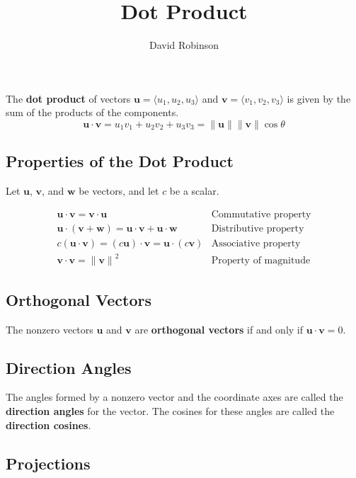 \documentclass{article}
\title{Dot Product}
\author{David Robinson}
\date{}
\begin{document}
\maketitle

The \textbf{dot product} of vectors $\mathbf{u}=\langle u_1, u_2, u_3 \rangle$ and $\mathbf{v}=\langle v_1, v_2, v_3 \rangle$ is given by the sum of the products of the components.
\[\mathbf{u}\cdot \mathbf{v}=u_1 v_1 + u_2 v_2 + u_3 v_3 = \|\mathbf{u}\| \|\mathbf{v}\| \cos\theta\]

\subsection*{Properties of the Dot Product}
Let $\mathbf{u}$, $\mathbf{v}$, and $\mathbf{w}$ be vectors, and let $c$ be a scalar.

\[
\begin{array}{ll}
    \mathbf{u}\cdot\mathbf{v} = \mathbf{v}\cdot\mathbf{u} & \text{Commutative property} \\[5pt]
    \mathbf{u}\cdot (\mathbf{v}+\mathbf{w}) = \mathbf{u}\cdot\mathbf{v} + \mathbf{u}\cdot\mathbf{w} & \text{Distributive property} \\[5pt]
    c (\mathbf{u}\cdot\mathbf{v}) = (c\mathbf{u})\cdot\mathbf{v} = \mathbf{u}\cdot (c\mathbf{v}) & \text{Associative property} \\[5pt]
    \mathbf{v}\cdot\mathbf{v} = {\|\mathbf{v}\|}^2 & \text{Property of magnitude}
\end{array}
\]

\subsection*{Orthogonal Vectors}
The nonzero vectors $\mathbf{u}$ and $\mathbf{v}$ are \textbf{orthogonal vectors} if and only if $\mathbf{u}\cdot\mathbf{v} = 0$.

\subsection*{Direction Angles}
The angles formed by a nonzero vector and the coordinate axes are called the \textbf{direction angles} for the vector. The cosines for these angles are called the \textbf{direction cosines}.

\subsection*{Projections}
\end{document}
